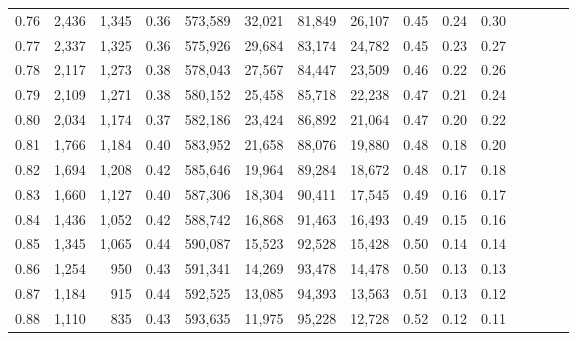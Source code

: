 \begin{tabular}{rrrcrrrrrrrrrrr}
0.76 &   2,436 &  1,345 &                                       0.36 &  573,589 &   32,021 &   81,849 &   26,107 &  0.45 &  0.24 &                         0.30 \\
0.77 &   2,337 &  1,325 &                                       0.36 &  575,926 &   29,684 &   83,174 &   24,782 &  0.45 &  0.23 &                         0.27 \\
0.78 &   2,117 &  1,273 &                                       0.38 &  578,043 &   27,567 &   84,447 &   23,509 &  0.46 &  0.22 &                         0.26 \\
0.79 &   2,109 &  1,271 &                                       0.38 &  580,152 &   25,458 &   85,718 &   22,238 &  0.47 &  0.21 &                         0.24 \\
0.80 &   2,034 &  1,174 &                                       0.37 &  582,186 &   23,424 &   86,892 &   21,064 &  0.47 &  0.20 &                         0.22 \\
0.81 &   1,766 &  1,184 &                                       0.40 &  583,952 &   21,658 &   88,076 &   19,880 &  0.48 &  0.18 &                         0.20 \\
0.82 &   1,694 &  1,208 &                                       0.42 &  585,646 &   19,964 &   89,284 &   18,672 &  0.48 &  0.17 &                         0.18 \\
0.83 &   1,660 &  1,127 &                                       0.40 &  587,306 &   18,304 &   90,411 &   17,545 &  0.49 &  0.16 &                         0.17 \\
0.84 &   1,436 &  1,052 &                                       0.42 &  588,742 &   16,868 &   91,463 &   16,493 &  0.49 &  0.15 &                         0.16 \\
0.85 &   1,345 &  1,065 &                                       0.44 &  590,087 &   15,523 &   92,528 &   15,428 &  0.50 &  0.14 &                         0.14 \\
0.86 &   1,254 &    950 &                                       0.43 &  591,341 &   14,269 &   93,478 &   14,478 &  0.50 &  0.13 &                         0.13 \\
0.87 &   1,184 &    915 &                                       0.44 &  592,525 &   13,085 &   94,393 &   13,563 &  0.51 &  0.13 &                         0.12 \\
0.88 &   1,110 &    835 &                                       0.43 &  593,635 &   11,975 &   95,228 &   12,728 &  0.52 &  0.12 &                         0.11 \\

\end{tabular}
